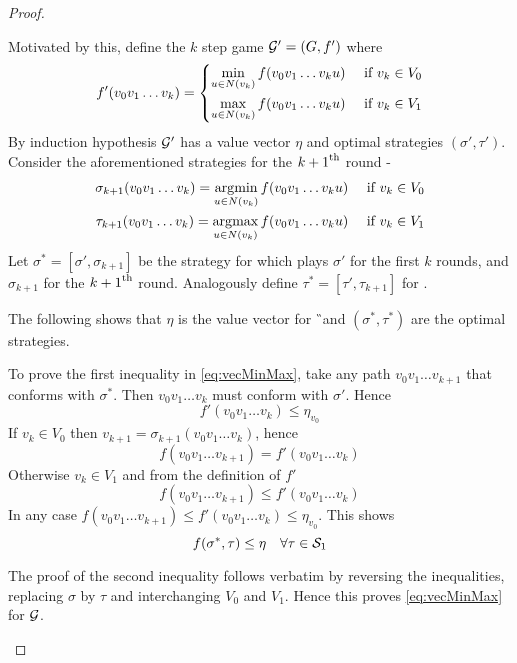 \begin{proof}
\begin{description}
        Motivated by this, define the $k$ step game $\G'=(G,f')$ where
            \[
                f'(v_0v_1 \ldots v_k) = \begin{dcases}
                    \min_{ u \in N(v_k) } f(v_0 v_1 \ldots v_k u) & \tif v_k \in V_0\\
                    \max_{ u \in N(v_k) } f(v_0 v_1 \ldots v_k u) & \tif v_k \in V_1
                \end{dcases} 
            \]
            By induction hypothesis $\G'$ has a value vector $\eta$ and optimal strategies $(\sigma',\tau')$.
            Consider the aforementioned strategies for the $\nth[k+1]$ round -
            \begin{align*}
                \sigma_{k+1}(v_0 v_1 \ldots v_k) = \argmin_{ u \in N(v_k) } f(v_0 v_1 \ldots v_k u) \quad \tif v_k \in V_0 \\
                \tau_{k+1}(v_0 v_1 \ldots v_k) = \argmax_{ u \in N(v_k) } f(v_0 v_1 \ldots v_k u) \quad \tif v_k \in V_1
            \end{align*}
            Let $\sigma^*=[\sigma',\sigma_{k+1}]$ be the strategy for  which plays $\sigma'$ for the first $k$ rounds, and $\sigma_{k+1}$ for the $\nth[k+1]$ round. Analogously define $\tau^*=[\tau',\tau_{k+1}]$ for .
            
            The following shows that $\eta$ is the value vector for \G\ and $(\sigma^*,\tau^*)$ are the optimal strategies.
            
            To prove the first inequality in \eqref{eq:vecMinMax}, take any path $v_0v_1 \ldots v_{k+1}$ that conforms with $\sigma^*$. Then $v_0v_1 \ldots v_k$ must conform with $\sigma'$. Hence 
            \[
                f'(v_0 v_1 \ldots v_k) \leq \eta_{v_0}
            \]
            If $v_k \in V_0$ then $v_{k+1}=\sigma_{k+1}(v_0 v_1 \ldots v_k)$, hence 
            \[
                f(v_0v_1 \ldots v_{k+1}) = f'(v_0v_1 \ldots v_k)
            \]
            Otherwise $v_k \in V_1$ and from the definition of $f'$
            \[
                f(v_0v_1 \ldots v_{k+1}) \leq f'(v_0v_1 \ldots v_k)
            \]
            In any case $f(v_0 v_1 \ldots v_{k+1}) \leq f'(v_0 v_1 \ldots v_k) \leq \eta_{v_0}$. This shows
            \[
                f(\sigma^*,\tau) \leq \eta \quad \forall \tau \in \ST{1}
            \]

            The proof of the second inequality follows verbatim by reversing the inequalities, replacing $\sigma$ by $\tau$ and interchanging $V_0$ and $V_1$. Hence this proves \eqref{eq:vecMinMax} for $\G$.
    \end{description}
\end{proof}
